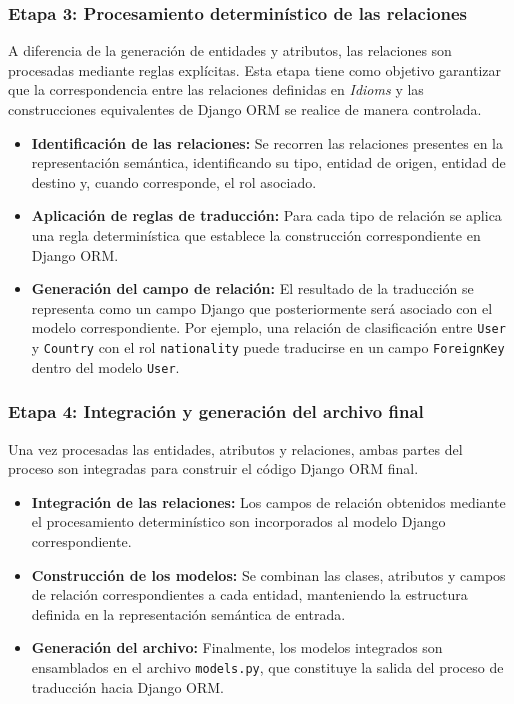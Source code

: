 \subsubsection*{Etapa 3: Procesamiento determinístico de las relaciones}

A diferencia de la generación de entidades y atributos, las relaciones son procesadas mediante reglas explícitas. Esta etapa tiene como objetivo garantizar que la correspondencia entre las relaciones definidas en \textit{Idioms} y las construcciones equivalentes de Django ORM se realice de manera controlada.

\begin{itemize}
    \item \textbf{Identificación de las relaciones:} Se recorren las relaciones presentes en la representación semántica, identificando su tipo, entidad de origen, entidad de destino y, cuando corresponde, el rol asociado.
    \item \textbf{Aplicación de reglas de traducción:} Para cada tipo de relación se aplica una regla determinística que establece la construcción correspondiente en Django ORM.
    \item \textbf{Generación del campo de relación:} El resultado de la traducción se representa como un campo Django que posteriormente será asociado con el modelo correspondiente. Por ejemplo, una relación de clasificación entre \texttt{User} y \texttt{Country} con el rol \texttt{nationality} puede traducirse en un campo \texttt{ForeignKey} dentro del modelo \texttt{User}.
\end{itemize}

\subsubsection*{Etapa 4: Integración y generación del archivo final}

Una vez procesadas las entidades, atributos y relaciones, ambas partes del proceso son integradas para construir el código Django ORM final.

\begin{itemize}
    \item \textbf{Integración de las relaciones:} Los campos de relación obtenidos mediante el procesamiento determinístico son incorporados al modelo Django correspondiente.
    \item \textbf{Construcción de los modelos:} Se combinan las clases, atributos y campos de relación correspondientes a cada entidad, manteniendo la estructura definida en la representación semántica de entrada.
    \item \textbf{Generación del archivo:} Finalmente, los modelos integrados son ensamblados en el archivo \texttt{models.py}, que constituye la salida del proceso de traducción hacia Django ORM.
\end{itemize}